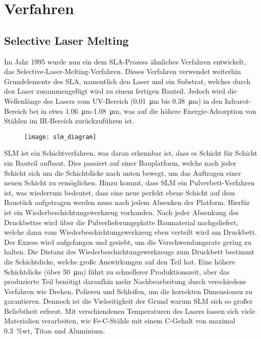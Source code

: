 \documentclass[../main.tex]{subfiles}
\begin{document}
\section{Verfahren}
\subsection{Selective Laser Melting}
Im Jahr 1995 wurde nun ein dem SLA-Prozess ähnliches Verfahren entwickelt, das Selective-Laser-Melting-Verfahren. Dieses Verfahren verwendet weiterhin Grundelemente des SLA, namentlich den Laser und ein Substrat, welches durch den Laser zusammengefügt wird zu einem fertigen Bauteil. 
Jedoch wird die Wellenlänge des Lasers vom UV-Bereich (\qty{0.01}{\micro\meter} bis \qty{0.38}{\micro\meter}) in den Infrarot-Bereich bei in etwa \qty{1.06}{\micro\meter}-\qty{1.08}{\micro\meter}, was auf die höhere Energie-Adsorption von Stählen im IR-Bereich zurückzuführen ist.\parencite{3FAKTUR_1}
\begin{figure}[h]
\begin{center}
	\texttt{[image: slm\_diagram]}
	\label{img:slm_diagram}
\end{center}
\end{figure}	
SLM ist ein Schichtverfahren, was daran erkennbar ist, dass es Schicht für Schicht ein Bauteil aufbaut. Dies passiert auf einer Bauplatform, welche nach jeder Schicht sich um die Schichtdicke nach unten bewegt, um das Auftragen einer neuen Schicht zu ermöglichen. 
Hinzu kommt, dass SLM ein Pulverbett-Verfahren ist, was wiederrum bedeutet, dass eine neue perfekt ebene Schicht auf dem Baustück aufgetragen werden muss nach jedem Absenken der Platform.
Hierfür ist ein Wiederbeschichtungswerkzeug vorhanden. Nach jeder Absenkung des Druckbettes wird über die Pulverlieferungsplatte Baumaterial nachgeliefert, welche dann vom Wiederbeschichtungswerkzeug eben verteilt wird am Druckbett. Der Exzess wird aufgefangen und gesiebt, um die Verschwendungsrate gering zu halten. 
Die Distanz des Wiederbeschichtungswerkzeugs zum Druckbett bestimmt die Schichtdicke, welche große Auswirkungen auf den Teil hat. Eine höhere Schichtdicke (über \qty{50}{\micro\meter}) führt zu schnellerer Produktionszeit, aber das produzierte Teil benötigt daraufhin mehr Nachbearbeitung durch verschiedene Verfahren wie Drehen, Polieren und Schleifen, um die korrekten Dimensionen zu garantieren.
Dennoch ist die Vielseitigkeit der Grund warum SLM sich so großer Beliebtheit erfreut. Mit verschiendenen Temperaturen des Lasers lassen sich viele Materialien verarbeiten, wie Fe-C-Stähle mit einem C-Gehalt von maximal \qty{0.3}{\percent}wt, Titan und Aluminium.
\end{document}
